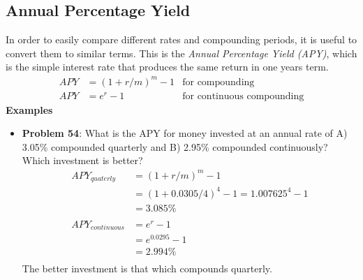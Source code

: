 \documentclass[14pt]{extarticle}
\begin{document}
\cleardoublepage

\subsection{Annual Percentage Yield}
In order to easily compare different rates and compounding periods, it is useful to convert them to similar terms. This is the \textit{Annual Percentage Yield (APY)}, which is the simple interest rate that produces the same return in one years term.
\begin{align*}
	APY &= (1+r/m)^m -1 &\text{for compounding}\tag{7} \\
	APY &= e^r -1 &\text{for continuous compounding}\tag{8}
\end{align*}
\textbf{Examples}
\begin{itemize}
	\item \textbf{Problem 54}: What is the APY for money invested at an annual rate of A) 3.05\% compounded quarterly and B) 2.95\% compounded continuously? Which investment is better?
	\begin{align*}
		APY_{quaterly} &= (1+r/m)^m -1 \\
		&= (1+0.0305/4)^4 -1 = 1.007625^4 -1\\
		&= 3.085\% \\\\
		APY_{continuous} &= e^r -1 \\
		&= e^0.0295 -1 \\
		& =2.994\% \\
	\end{align*}
	The better investment is that which compounds quarterly.
\end{itemize}

\cleardoublepage
\end{document}
